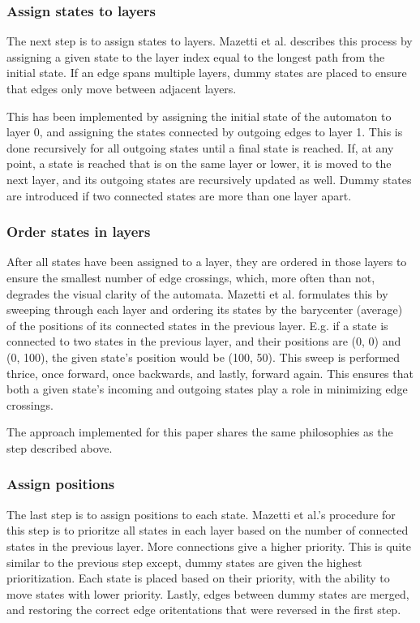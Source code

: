 

\subsubsection{Assign states to layers}
The next step is to assign states to layers. Mazetti et al. describes this process by assigning a given state to the layer index equal to the longest path from the initial state. If an edge spans multiple layers, dummy states are placed to ensure that edges only move between adjacent layers. \cite{Mazetti2012}

This has been implemented by assigning the initial state of the automaton to layer 0, and assigning the states connected by outgoing edges to layer 1.
This is done recursively for all outgoing states until a final state is reached.
If, at any point, a state is reached that is on the same layer or lower, it is moved to the next layer, and its outgoing states are recursively updated as well.
Dummy states are introduced if two connected states are more than one layer apart.



\subsubsection{Order states in layers}
After all states have been assigned to a layer, they are ordered in those layers to ensure the smallest number of edge crossings, which, more often than not, degrades the visual clarity of the automata.
Mazetti et al. formulates this by sweeping through each layer and ordering its states by the barycenter (average) of the positions of its connected states in the previous layer.
E.g. if a state is connected to two states in the previous layer, and their positions are (0, 0) and (0, 100), the given state's position would be (100, 50).
This sweep is performed thrice, once forward, once backwards, and lastly, forward again.
This ensures that both a given state's incoming and outgoing states play a role in minimizing edge crossings. \cite{Mazetti2012}

The approach implemented for this paper shares the same philosophies as the step described above.



\subsubsection{Assign positions}
The last step is to assign positions to each state.
Mazetti et al.'s procedure for this step is to prioritze all states in each layer based on the number of connected states in the previous layer.
More connections give a higher priority. This is quite similar to the previous step except, dummy states are given the highest prioritization.
Each state is placed based on their priority, with the ability to move states with lower priority.
Lastly, edges between dummy states are merged, and restoring the correct edge oritentations that were reversed in the first step. \cite{Mazetti2012}

